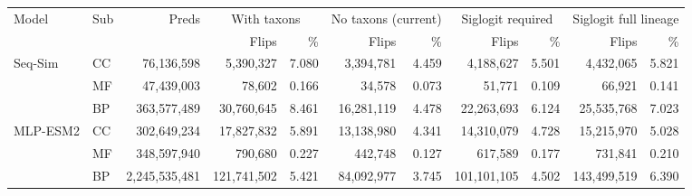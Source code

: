 \begin{tabular}{llrrrrrrrrr}
\toprule
Model & Sub & Preds & \multicolumn{2}{c}{With taxons} & \multicolumn{2}{c}{No taxons (current)} & \multicolumn{2}{c}{Siglogit required} & \multicolumn{2}{c}{Siglogit full lineage} \\
\cmidrule(lr){4-5}\cmidrule(lr){6-7}\cmidrule(lr){8-9}\cmidrule(lr){10-11}
& & & Flips & \% & Flips & \% & Flips & \% & Flips & \% \\
\midrule
Seq-Sim & CC & 76{,}136{,}598 & 5{,}390{,}327 & 7.080 & 3{,}394{,}781 & 4.459 & 4{,}188{,}627 & 5.501 & 4{,}432{,}065 & 5.821 \\
 & MF & 47{,}439{,}003 & 78{,}602 & 0.166 & 34{,}578 & 0.073 & 51{,}771 & 0.109 & 66{,}921 & 0.141 \\
 & BP & 363{,}577{,}489 & 30{,}760{,}645 & 8.461 & 16{,}281{,}119 & 4.478 & 22{,}263{,}693 & 6.124 & 25{,}535{,}768 & 7.023 \\
\midrule
MLP-ESM2 & CC & 302{,}649{,}234 & 17{,}827{,}832 & 5.891 & 13{,}138{,}980 & 4.341 & 14{,}310{,}079 & 4.728 & 15{,}215{,}970 & 5.028 \\
 & MF & 348{,}597{,}940 & 790{,}680 & 0.227 & 442{,}748 & 0.127 & 617{,}589 & 0.177 & 731{,}841 & 0.210 \\
 & BP & 2{,}245{,}535{,}481 & 121{,}741{,}502 & 5.421 & 84{,}092{,}977 & 3.745 & 101{,}101{,}105 & 4.502 & 143{,}499{,}519 & 6.390 \\
\bottomrule
\end{tabular}
